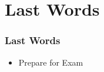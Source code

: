 \documentclass[newPxFont,sthlmFooter,nooffset]{beamer}
\begin{document}

\section{Last Words}

\begin{frame}[t]
  \frametitle{Last Words}
\begin{itemize}
\item Prepare for Exam
\end{itemize}
\end{frame}
\end{document}
